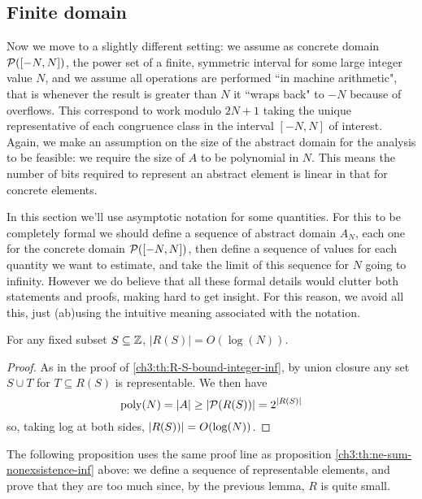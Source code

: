 \subsection{Finite domain}
Now we move to a slightly different setting: we assume as concrete domain $\mathcal{P}([-N, N])$, the power set of a finite, symmetric interval for some large integer value $N$, and we assume all operations are performed ``in machine arithmetic", that is whenever the result is greater than $N$ it ``wraps back" to $-N$ because of overflows. This correspond to work modulo $2N + 1$ taking the unique representative of each congruence class in the interval $[-N, N]$ of interest.
Again, we make an assumption on the size of the abstract domain for the analysis to be feasible: we require the size of $A$ to be polynomial in $N$. This means the number of bits required to represent an abstract element is linear in that for concrete elements.

In this section we'll use asymptotic notation for some quantities. For this to be completely formal we should define a sequence of abstract domain $A_N$, each one for the concrete domain $\mathcal{P}([-N, N])$, then define a sequence of values for each quantity we want to estimate, and take the limit of this sequence for $N$ going to infinity. However we do believe that all these formal details would clutter both statements and proofs, making hard to get insight. For this reason, we avoid all this, just (ab)using the intuitive meaning associated with the notation.

\begin{lemma}\label{ch3:th:R-S-bound-integer-fin}
	For any fixed subset $S \subseteq \mathbb{Z}$, $\lvert R(S) \rvert = O(\log(N))$.
\end{lemma}
\begin{proof}
	As in the proof of \ref{ch3:th:R-S-bound-integer-inf}, by union closure any set $S \cup T$ for $T \subseteq R(S)$ is representable. We then have
	\[
	\text{poly}(N) = \lvert A\rvert \ge \lvert\mathcal{P}(R(S))\rvert = 2^{\lvert R(S)\rvert}
	\]
	so, taking log at both sides, $\lvert R(S))\rvert = O(\log(N))$.
\end{proof}

The following proposition uses the same proof line as proposition \ref{ch3:th:ne-sum-nonexsistence-inf} above: we define a sequence of representable elements, and prove that they are too much since, by the previous lemma, $R$ is quite small.


